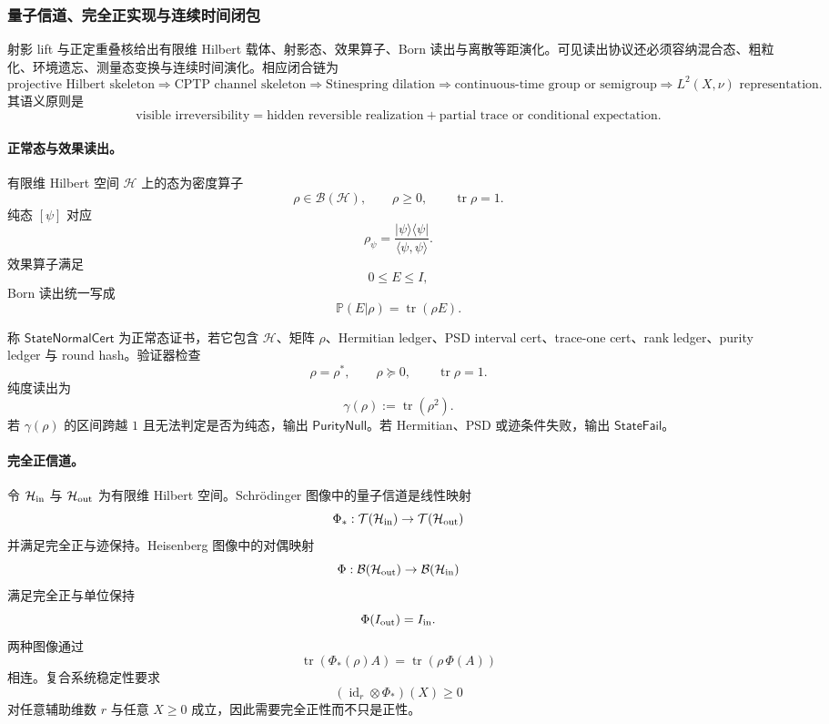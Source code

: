 \subsubsection{量子信道、完全正实现与连续时间闭包}\label{subsubsec:typed-address-biaxial-completion-open-quantum-channel-continuous-time-closure}
射影 lift 与正定重叠核给出有限维 Hilbert 载体、射影态、效果算子、Born 读出与离散等距演化。可见读出协议还必须容纳混合态、粗粒化、环境遗忘、测量态变换与连续时间演化。相应闭合链为
\[
\text{projective Hilbert skeleton}
\Longrightarrow
\text{CPTP channel skeleton}
\Longrightarrow
\text{Stinespring dilation}
\Longrightarrow
\text{continuous-time group or semigroup}
\Longrightarrow
L^2(X,\nu)\text{ representation}.
\]
其语义原则是
\[
\boxed{
\text{visible irreversibility}
=
\text{hidden reversible realization}
+
\text{partial trace or conditional expectation}.
}
\]

\paragraph{正常态与效果读出。}
有限维 Hilbert 空间 \(\mathcal H\) 上的态为密度算子
\[
\rho\in\mathcal B(\mathcal H),
\qquad
\rho\ge0,
\qquad
\operatorname{tr}\rho=1.
\]
纯态 \([\psi]\) 对应
\[
\rho_\psi=
\frac{|\psi\rangle\langle\psi|}
{\langle\psi,\psi\rangle}.
\]
效果算子满足
\[
0\le E\le I,
\]
Born 读出统一写成
\[
\boxed{
\mathbb P(E|\rho)=\operatorname{tr}(\rho E).
}
\]

\begin{definition}[正常态证书]\label{def:typed-address-biaxial-completion-state-normal-cert}
称 \(\mathsf{StateNormalCert}\) 为正常态证书，若它包含 \(\mathcal H\)、矩阵 \(\rho\)、Hermitian ledger、PSD interval cert、trace-one cert、rank ledger、purity ledger 与 round hash。验证器检查
\[
\rho=\rho^*,
\qquad
\rho\succeq0,
\qquad
\operatorname{tr}\rho=1.
\]
纯度读出为
\[
\gamma(\rho):=\operatorname{tr}(\rho^2).
\]
若 \(\gamma(\rho)\) 的区间跨越 \(1\) 且无法判定是否为纯态，输出 \(\mathsf{PurityNull}\)。若 Hermitian、PSD 或迹条件失败，输出 \(\mathsf{StateFail}\)。
\end{definition}

\paragraph{完全正信道。}
令 \(\mathcal H_{\rm in}\) 与 \(\mathcal H_{\rm out}\) 为有限维 Hilbert 空间。Schr\"odinger 图像中的量子信道是线性映射
\[
\Phi_{\ast}:\mathcal T(\mathcal H_{\rm in})
\to
\mathcal T(\mathcal H_{\rm out})
\]
并满足完全正与迹保持。Heisenberg 图像中的对偶映射
\[
\Phi:\mathcal B(\mathcal H_{\rm out})
\to
\mathcal B(\mathcal H_{\rm in})
\]
满足完全正与单位保持
\[
\Phi(I_{\rm out})=I_{\rm in}.
\]
两种图像通过
\[
\boxed{
\operatorname{tr}(\Phi_{\ast}(\rho)A)
=
\operatorname{tr}(\rho\,\Phi(A))
}
\]
相连。复合系统稳定性要求
\[
(\operatorname{id}_r\otimes\Phi_{\ast})(X)\ge0
\]
对任意辅助维数 \(r\) 与任意 \(X\ge0\) 成立，因此需要完全正性而不只是正性。

